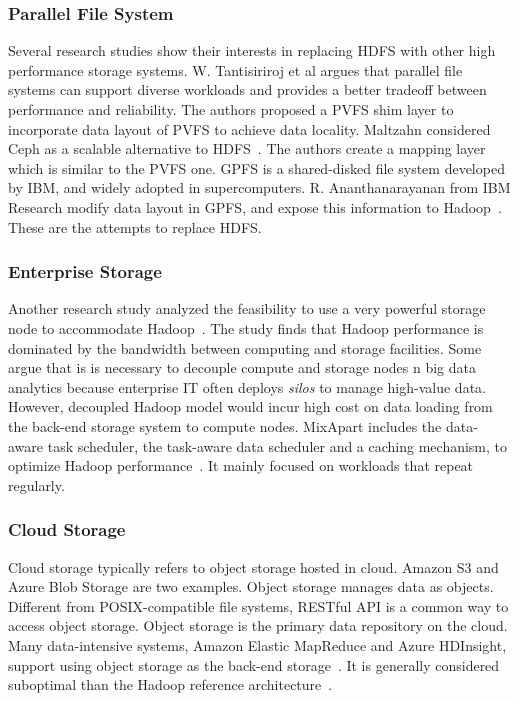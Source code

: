 \subsubsection*{Parallel File System}
Several research studies show their interests in replacing HDFS with other high performance storage systems.  
W. Tantisiriroj et al \cite{TantisirirojWittawat2011Duality} argues that parallel file systems can support diverse workloads and provides a better tradeoff between performance and reliability.
The authors proposed a PVFS shim layer to incorporate data layout of PVFS to achieve data locality.
Maltzahn \etal considered Ceph as a scalable alternative to HDFS~\cite{MaltzahnC2010_Ceph}.
The authors create a mapping layer which is similar to the PVFS one.
GPFS is a shared-disked file system developed by IBM, and widely adopted in supercomputers. 
R. Ananthanarayanan \etal from IBM Research modify data layout in GPFS, and
expose this information to Hadoop~\cite{AnanthanarayananR2009_CloudAnalytics}.
These are the attempts to replace HDFS.

\subsubsection*{Enterprise Storage}

Another research study analyzed the feasibility to use a very powerful storage node
to accommodate Hadoop~\cite{PorterG2010_SuperDataNodes}.
The study finds that Hadoop performance is dominated by the bandwidth
between computing and storage facilities.
Some argue that is is necessary to decouple compute and storage nodes 
n big data analytics
because enterprise IT often deploys \textit{silos}
to manage high-value data.
However, decoupled Hadoop model would incur high cost on data loading
from the back-end storage system to compute nodes.
MixApart includes the data-aware task scheduler, the task-aware data scheduler and a caching mechanism, to optimize Hadoop performance~\cite{MihailescuM2012_MixApart}.
It mainly focused on workloads that repeat regularly.

\subsubsection*{Cloud Storage}

Cloud storage typically refers to object storage hosted in cloud.
Amazon S3 and Azure Blob Storage are two examples.
Object storage manages data as objects.
Different from POSIX-compatible file systems,
RESTful API is a common way to access object storage.
Object storage is the primary data repository on the cloud.
Many data-intensive systems, \eg Amazon Elastic MapReduce and Azure HDInsight,
support using object storage as the back-end storage~\cite{aws, WindowsAzure}.
It is generally considered suboptimal than
the Hadoop reference architecture~\cite{hadoop}.

%